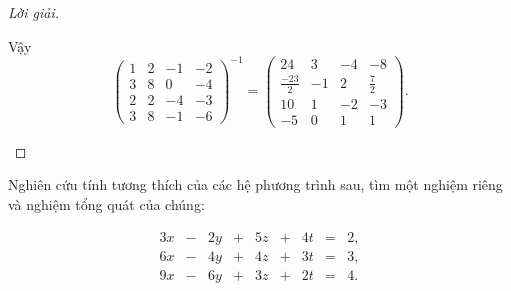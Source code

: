\begin{proof}[Lời giải]
\begin{enumerate}[label = (\alph*)]
              Vậy
              \[
                  \begin{pmatrix}
                      1 & 2 & -1 & -2 \\
                      3 & 8 & 0  & -4 \\
                      2 & 2 & -4 & -3 \\
                      3 & 8 & -1 & -6
                  \end{pmatrix}^{-1}
                  =
                  \begin{pmatrix}
                      24            & 3  & -4 & -8          \\
                      \frac{-23}{2} & -1 & 2  & \frac{7}{2} \\
                      10            & 1  & -2 & -3          \\
                      -5            & 0  & 1  & 1
                  \end{pmatrix}.
              \]
              \endgroup{}
    \end{enumerate}
\end{proof}

Nghiên cứu tính tương thích của các hệ phương trình sau, tìm một nghiệm riêng và nghiệm tổng quát của chúng:

\begin{exercise}
    \[
        \begin{array}{ccccccccc}
            3x & - & 2y & + & 5z & + & 4t & = & 2, \\
            6x & - & 4y & + & 4z & + & 3t & = & 3, \\
            9x & - & 6y & + & 3z & + & 2t & = & 4.
        \end{array}
    \]
\end{exercise}

